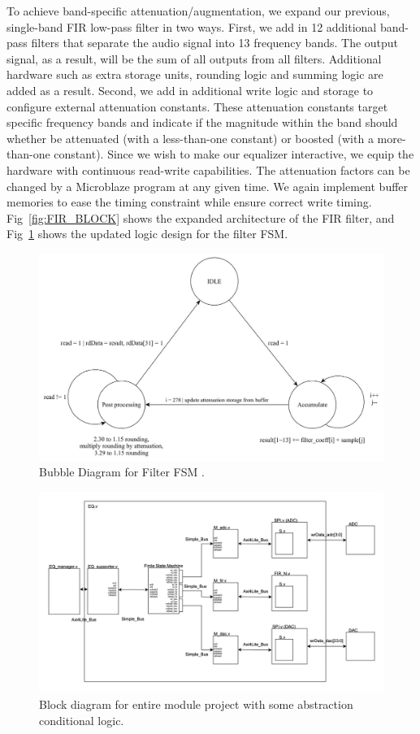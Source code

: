 \documentclass[journal]{IEEEtran} %
\begin{document}
To achieve band-specific attenuation/augmentation, we expand our previous, single-band FIR low-pass filter in two ways. First, we add in 12 additional band-pass filters that separate the audio signal into 13 frequency bands. The output signal, as a result, will be the sum of all outputs from all filters. Additional hardware such as extra storage units, rounding logic and summing logic are added as a result. Second, we add in additional write logic and storage to configure external attenuation constants. These attenuation constants target specific frequency bands and indicate if the magnitude within the band should whether be attenuated (with a less-than-one constant) or boosted (with a more-than-one constant). Since we wish to make our equalizer interactive, we equip the hardware with continuous read-write capabilities. The attenuation factors can be changed by a Microblaze\textregistered{} program at any given time. We again implement buffer memories to ease the timing constraint while ensure correct write timing. Fig~\ref{fig:FIR_BLOCK} shows the expanded architecture of the FIR filter, and Fig~\ref{fig:FIR_FSM} shows the updated logic design for the filter FSM.

\begin{figure}[htbp]
\centering
\includegraphics[width=0.9\linewidth]{Figures/EQ/fir_fsm.jpg}
\caption{\label{fig:FIR_FSM} Bubble Diagram for Filter FSM .}
\end{figure}

\begin{figure}[htbp]
\centering
\includegraphics[width=0.9\linewidth]{Figures/EQ/eq_block.png}
\caption{\label{fig:EQ_BLOCK}Block diagram for entire module project with some abstraction conditional logic.}
\end{figure}
\end{document}

